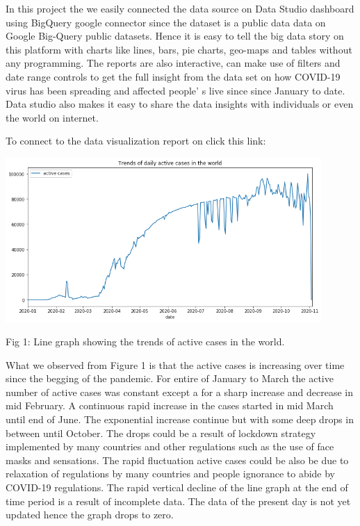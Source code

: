 \documentclass[12pt]{article}
\begin{document}
 In this project the we easily connected the data source on Data Studio dashboard using  BigQuery google connector since the dataset is a public data data on Google Big-Query public datasets. Hence it is easy to tell the big data story on this platform with charts like lines, bars, pie charts, geo-maps and tables without any programming. The reports are also interactive, can make use of filters and date range controls to get the full insight from the data set on how COVID-19 virus has been spreading  and affected people' s live since since January to date. Data studio also makes it easy to share the data insights with individuals  or even the world on internet. 
 
 To connect to the data visualization report on click this link:
 
 
\includegraphics[width=0.9\textwidth,inner]{activecases.png}
\caption{Fig 1: Line graph showing the trends of active cases in the world.}

What we observed  from Figure 1 is that the active cases is increasing over time since the begging of the pandemic. For entire of January to March the active number of active cases was constant except a for a sharp increase and decrease in mid February. A continuous rapid increase in the cases started in mid March  until end of June. The exponential increase continue but with some deep drops in between until October.  The drops could be a result of lockdown strategy implemented by many countries and other regulations such as the use of face masks and sensations. The  rapid  fluctuation  active cases could be also be due to relaxation of regulations by many countries and people ignorance to abide by COVID-19 regulations. The rapid vertical decline of the line graph at the end of time period is a result of incomplete data. The data of the present day is not yet updated hence the graph drops to zero. 
\end{document}
